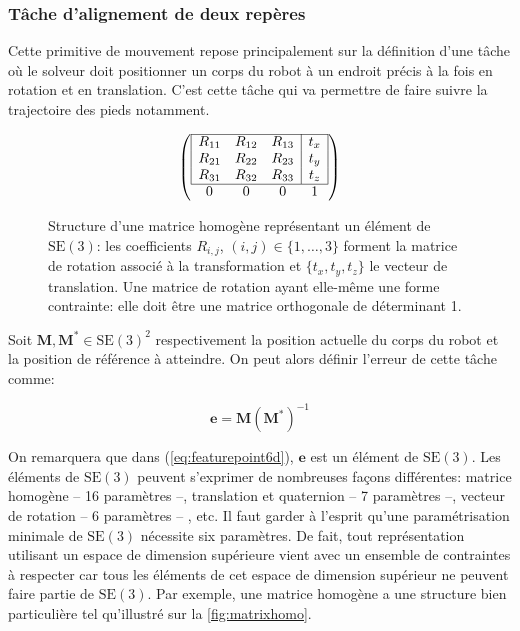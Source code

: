 \subsubsection{Tâche d'alignement de deux repères}

Cette primitive de mouvement repose principalement sur la définition
d'une tâche où le solveur doit positionner un corps du robot à un
endroit précis à la fois en rotation et en translation. C'est cette
tâche qui va permettre de faire suivre la trajectoire des pieds
notamment.

\begin{figure}
  \begin{center}
    \begin{equation}
      \left (
      \begin{array}{cccc}
        \cline{1-4}
        \multicolumn{1}{|c}{R_{11}} & R_{12} & R_{13} & \multicolumn{1}{|c|}{t_x} \\
        \multicolumn{1}{|c}{R_{21}} & R_{22} & R_{23} & \multicolumn{1}{|c|}{t_y} \\
        \multicolumn{1}{|c}{R_{31}} & R_{32} & R_{33} & \multicolumn{1}{|c|}{t_z} \\
        \cline{1-4}
        0 & 0 & 0 & 1
      \end{array}
      \right )
    \end{equation}
  \end{center}
  \caption{Structure d'une matrice homogène représentant un élément de
    $\text{SE}(3)$: les coefficients $R_{i,j}$, $(i,j) \in \{1,
    \dotsc, 3\}$ forment la matrice de rotation associé à la
    transformation et $\{t_x, t_y, t_z\}$ le vecteur de
    translation. Une matrice de rotation ayant elle-même une forme
    contrainte: elle doit être une matrice orthogonale de déterminant
    1. \label{fig:matrixhomo}}
\end{figure}


Soit $\mathbf{M}, \mathbf{M}^{*} \in \text{SE}(3)^2$
respectivement la position actuelle du corps du robot et la position
de référence à atteindre. On peut alors définir l'erreur de cette
tâche comme:

\begin{equation}\label{eq:featurepoint6d}
  \mathbf{e} = \mathbf{M} (\mathbf{M}^{*})^{-1}
\end{equation}

On remarquera que dans (\autoref{eq:featurepoint6d}), $\mathbf{e}$ est
un élément de $\text{SE}(3)$. Les éléments de $\text{SE}(3)$ peuvent
s'exprimer de nombreuses façons différentes: matrice homogène -- 16
paramètres --, translation et quaternion -- 7 paramètres
--, vecteur de rotation -- 6 paramètres --
, etc. Il faut garder à l'esprit qu'une
paramétrisation minimale de $\text{SE}(3)$ nécessite six
paramètres. De fait, tout représentation utilisant un espace de
dimension supérieure vient avec un ensemble de contraintes à respecter
car tous les éléments de cet espace de dimension supérieur ne peuvent
faire partie de $\text{SE}(3)$. Par exemple, une matrice homogène a une
structure bien particulière tel qu'illustré sur la
\autoref{fig:matrixhomo}.

